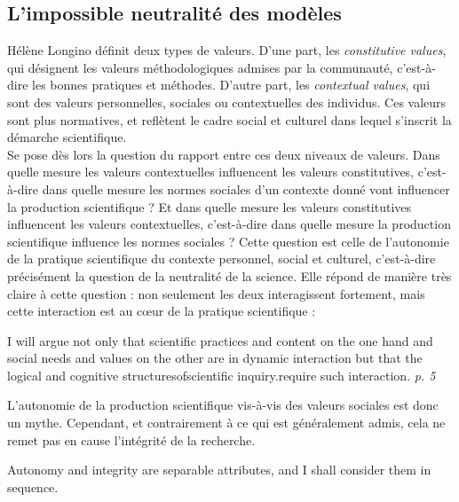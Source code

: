 \subsection{L'impossible neutralité des modèles}

Hélène Longino définit deux types de valeurs. D'une part, les \emph{constitutive values}, qui désignent les valeurs méthodologiques admises par la communauté, c'est-à-dire les bonnes pratiques et méthodes. D'autre part, les \emph{contextual values}, qui sont des valeurs personnelles, sociales ou contextuelles des individus. Ces valeurs sont plus normatives, et reflètent le cadre social et culturel dans lequel s'inscrit la démarche scientifique. \\

Se pose dès lors la question du rapport entre ces deux niveaux de valeurs. Dans quelle mesure les valeurs contextuelles influencent les valeurs constitutives, c'est-à-dire dans quelle mesure les normes sociales d'un contexte donné vont influencer la production scientifique ? Et dans quelle mesure les valeurs constitutives influencent les valeurs contextuelles, c'est-à-dire dans quelle mesure la production scientifique influence les normes sociales ? Cette question est celle de l'autonomie de la pratique scientifique du contexte personnel, social et culturel, c'est-à-dire précisément la question de la neutralité de la science. Elle répond de manière très claire à cette question : non seulement les deux interagissent fortement, mais cette interaction est au cœur de la pratique scientifique : 

\begin{authoredquote}
    I will argue not only that scientific practices and content on the one hand and social needs and values on the other are in dynamic interaction but that the logical and cognitive structuresofscientific inquiry.require such interaction. \textit{p. 5}
\end{authoredquote}

L'autonomie de la production scientifique vis-à-vis des valeurs sociales est donc un mythe. Cependant, et contrairement à ce qui est généralement admis, cela ne remet pas en cause l'intégrité de la recherche. 

\begin{authoredquote}
    Autonomy and integrity are separable attributes, and I shall consider them in sequence.
\end{authoredquote}

